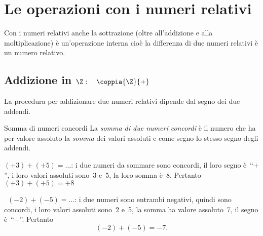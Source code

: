 
\section{Le operazioni con i numeri relativi}
\label{sec:int_operazioni}

Con i numeri relativi anche la sottrazione (oltre all'addizione e alla 
moltiplicazione) è un'operazione interna cioè la differenza di due numeri 
relativi è un numero relativo.

\subsection{Addizione in $\Z: \quad \coppia{\Z}{+}$}


La procedura per addizionare due numeri relativi dipende dal segno dei due 
addendi.

\begin{definizione}{Somma di numeri concordi}{}
La \emph{somma di due numeri concordi} è il numero che ha per 
valore assoluto la \emph{somma} dei valori assoluti e
come segno lo stesso segno degli addendi.
\end{definizione}

\begin{esempio}{}{}
\( (+3)+(+5)=\ldots\): i due numeri da sommare sono concordi, 
il loro segno è~``\(+\)'', i loro valori assoluti sono~3 e~5,
la loro somma è~8. Pertanto~\((+3)+(+5)=+8\)
\end{esempio}

\begin{esempio}{}{}
~\((-2)+(-5)=\ldots\): i due numeri sono entrambi negativi, quindi sono 
concordi, 
i loro valori assoluti sono~2 e~5,
la somma ha valore assoluto~7, il segno è~``\(-\)''. Pertanto
\[(-2)+(-5)=-7.\]
\end{esempio}

